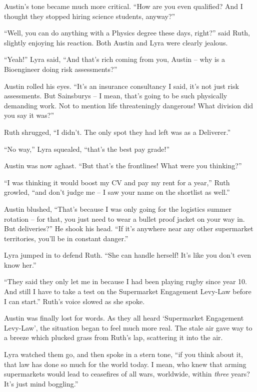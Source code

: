 Austin’s tone became much more critical. “How are you even qualified? And I thought they stopped hiring science students, anyway?”

“Well, you can do anything with a Physics degree these days, right?” said Ruth, slightly enjoying his reaction. Both Austin and Lyra were clearly jealous. 

“Yeah!” Lyra said, “And that’s rich coming from you, Austin – why is a Bioengineer doing risk assessments?” 

Austin rolled his eyes. “It’s an insurance consultancy I said, it’s not just risk assessments. But Sainsburys – I mean, that’s going to be such physically demanding work. Not to mention life threateningly dangerous! What division did you say it was?”

Ruth shrugged, “I didn’t. The only spot they had left was as a Deliverer.”

“No way,” Lyra squealed, “that’s the best pay grade!”

Austin was now aghast. “But that’s the frontlines! What were you thinking?” 

“I was thinking it would boost my CV and pay my rent for a year,” Ruth growled, “and don’t judge me – I saw your name on the shortlist as well.”

Austin blushed, “That’s because I was only going for the logistics summer rotation – for that, you just need to wear a bullet proof jacket on your way in. But deliveries?” He shook his head. “If it’s anywhere near any other supermarket territories, you’ll be in constant danger.”

Lyra jumped in to defend Ruth. “She can handle herself! It’s like you don’t even know her.”

“They said they only let me in because I had been playing rugby since year 10. And still I have to take a test on the Supermarket Engagement Levy-Law before I can start.” Ruth’s voice slowed as she spoke. 

Austin was finally lost for words. As they all heard ‘Supermarket Engagement Levy-Law’, the situation began to feel much more real. The stale air gave way to a breeze which plucked grass from Ruth’s lap, scattering it into the air.

Lyra watched them go, and then spoke in a stern tone, “if you think about it, that law has done so much for the world today. I mean, who knew that arming supermarkets would lead to ceasefires of all wars, worldwide, within \emph{three} years? It’s just mind boggling.”

